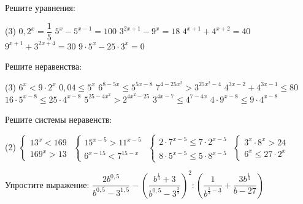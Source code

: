 \begin{class}[number=6]
	\begin{listofex}
		\item Решите уравнения:
		\begin{tasks}(3)
			\task \( 0,2^x=\dfrac{1}{5} \)
			\task \( 5^x-5^{x-1}=100 \)
			\task \( 3^{2x+1}-9^x=18 \)
			\task \( 4^{x+1}+4^{x+2}=40 \)
			\task \( 9^{x+1}+3^{2x+4}=30 \)
			\task \( 9\cdot 5^x-25 \cdot 3^x=0 \)
		\end{tasks}
		\item Решите неравенства: %
		\begin{tasks}(3)
			\task \( 6^x<9 \cdot 2^x \)
			\task \( 0,04 \le 5^x \)
			\task \( 6^{8-5x} \le 5^{5x-8} \)
			\task \( 7^{4-25x^2} > 3^{25x^2-4} \)
			\task \( 4^{3x-2} + 4^{3x-1} \le 80 \)
			\task \( 16 \cdot 5^{x-8} \le 25 \cdot 4^{x-8} \)
			\task \( 5^{25-4x^2} > 2^{4x^2-25} \)
			\task \( 3^{4x-7} \le 4^{7-4x}  \)
			\task \( 4 \cdot 9^{x-8} \le 9 \cdot 4^{x-8} \)
		\end{tasks}
		\item Решите системы неравенств:
		\begin{tasks}(2)
			\task \( \begin{cases} 13^x<169 \\ 169^x > 13 \end{cases} \)
			\task \( \begin{cases} 15^{x-5}>11^{x-5} \\ 6^{x-15}<7^{15-x} \end{cases} \)
			\task \( \begin{cases} 2 \cdot 7^{x-5} \le 7 \cdot 2^{x-5} \\ 8 \cdot 5^{x-5} \le 5 \cdot 8^{x-5} \end{cases} \)
			\task \( \begin{cases} 3^x \cdot 8^x > 24 \\ 6^x \le 27 \cdot 2^x \end{cases} \)
		\end{tasks}
		\item Упростите выражение: \( \dfrac{2b^{0,5}}{b^{0,5}-3^{1,5}} - \left( \dfrac{b^{\tfrac{1}{3}}+3}{b^{0,5}-3^{\tfrac{3}{2}}} \right)^2 : \left( \dfrac{1}{b^{\tfrac{1}{3}-3}} + \dfrac{3b^{\tfrac{1}{3}}}{b-27} \right) \)
	\end{listofex}
\end{class}
	
